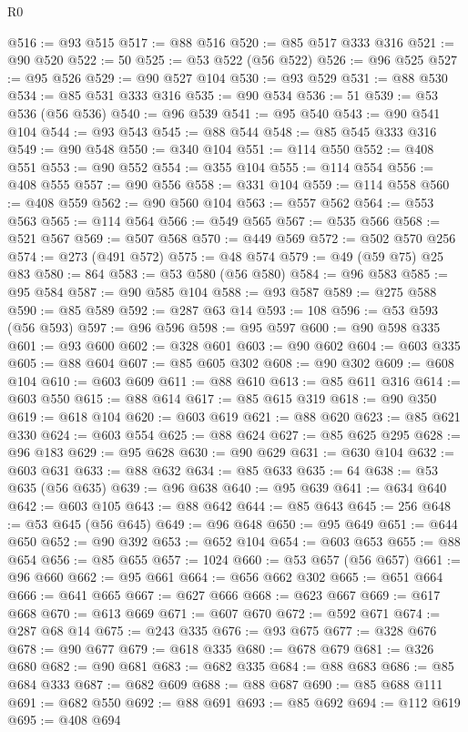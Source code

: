 \begin{lexlean}{R0}
\begin{coremodule}
@516 := @93 @515
@517 := @88 @516
@520 := @85 @517 @333 @316
@521 := @90 @520
@522 := 50
@525 := @53 @522 (@56 @522)
@526 := @96 @525
@527 := @95 @526
@529 := @90 @527 @104
@530 := @93 @529
@531 := @88 @530
@534 := @85 @531 @333 @316
@535 := @90 @534
@536 := 51
@539 := @53 @536 (@56 @536)
@540 := @96 @539
@541 := @95 @540
@543 := @90 @541 @104
@544 := @93 @543
@545 := @88 @544
@548 := @85 @545 @333 @316
@549 := @90 @548
@550 := @340 @104
@551 := @114 @550
@552 := @408 @551
@553 := @90 @552
@554 := @355 @104
@555 := @114 @554
@556 := @408 @555
@557 := @90 @556
@558 := @331 @104
@559 := @114 @558
@560 := @408 @559
@562 := @90 @560 @104
@563 := @557 @562
@564 := @553 @563
@565 := @114 @564
@566 := @549 @565
@567 := @535 @566
@568 := @521 @567
@569 := @507 @568
@570 := @449 @569
@572 := @502 @570 @256
@574 := @273 (@491 @572)
@575 := @48 @574
@579 := @49 (@59 @75) @25 @83
@580 := 864
@583 := @53 @580 (@56 @580)
@584 := @96 @583
@585 := @95 @584
@587 := @90 @585 @104
@588 := @93 @587
@589 := @275 @588
@590 := @85 @589
@592 := @287 @63 @14
@593 := 108
@596 := @53 @593 (@56 @593)
@597 := @96 @596
@598 := @95 @597
@600 := @90 @598 @335
@601 := @93 @600
@602 := @328 @601
@603 := @90 @602
@604 := @603 @335
@605 := @88 @604
@607 := @85 @605 @302
@608 := @90 @302
@609 := @608 @104
@610 := @603 @609
@611 := @88 @610
@613 := @85 @611 @316
@614 := @603 @550
@615 := @88 @614
@617 := @85 @615 @319
@618 := @90 @350
@619 := @618 @104
@620 := @603 @619
@621 := @88 @620
@623 := @85 @621 @330
@624 := @603 @554
@625 := @88 @624
@627 := @85 @625 @295
@628 := @96 @183
@629 := @95 @628
@630 := @90 @629
@631 := @630 @104
@632 := @603 @631
@633 := @88 @632
@634 := @85 @633
@635 := 64
@638 := @53 @635 (@56 @635)
@639 := @96 @638
@640 := @95 @639
@641 := @634 @640
@642 := @603 @105
@643 := @88 @642
@644 := @85 @643
@645 := 256
@648 := @53 @645 (@56 @645)
@649 := @96 @648
@650 := @95 @649
@651 := @644 @650
@652 := @90 @392
@653 := @652 @104
@654 := @603 @653
@655 := @88 @654
@656 := @85 @655
@657 := 1024
@660 := @53 @657 (@56 @657)
@661 := @96 @660
@662 := @95 @661
@664 := @656 @662 @302
@665 := @651 @664
@666 := @641 @665
@667 := @627 @666
@668 := @623 @667
@669 := @617 @668
@670 := @613 @669
@671 := @607 @670
@672 := @592 @671
@674 := @287 @68 @14
@675 := @243 @335
@676 := @93 @675
@677 := @328 @676
@678 := @90 @677
@679 := @618 @335
@680 := @678 @679
@681 := @326 @680
@682 := @90 @681
@683 := @682 @335
@684 := @88 @683
@686 := @85 @684 @333
@687 := @682 @609
@688 := @88 @687
@690 := @85 @688 @111
@691 := @682 @550
@692 := @88 @691
@693 := @85 @692
@694 := @112 @619
@695 := @408 @694

\end{coremodule}
\end{lexlean}
